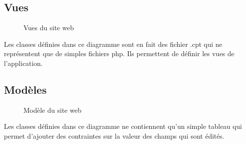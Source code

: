 \subsection{Vues}

\begin{figure}[H]
	\begin{center}\end{center}
	\caption{Vues du site web}
\end{figure}

Les classes définies dans ce diagramme sont en fait des fichier .cpt qui ne représentent que de simples fichiers php. Ils permettent de définir les vues de l'application.

\subsection{Modèles}

\begin{figure}[H]
	\begin{center}\end{center}
	\caption{Modèle du site web}
\end{figure}

Les classes définies dans ce diagramme ne contiennent qu'un simple tableau qui permet d'ajouter des contraintes sur la valeur des champs qui sont édités.
